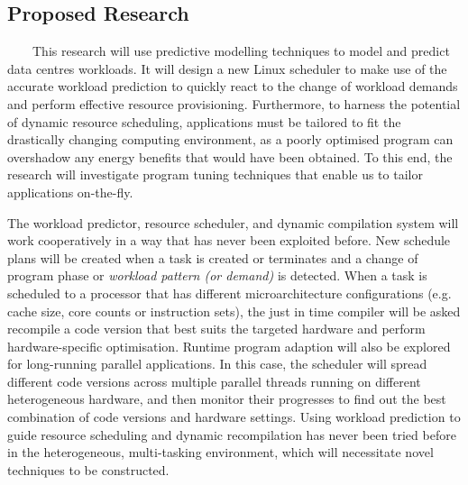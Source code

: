 \subsection{Proposed Research}
~~~~This research will use predictive modelling techniques to model and predict data centres workloads. It
will design a new Linux scheduler to make use of the accurate workload prediction to quickly react to
the change of workload demands and perform effective resource provisioning. Furthermore, to harness
the potential of dynamic resource scheduling, applications must be tailored to fit the drastically changing computing 
environment, as a poorly optimised program can overshadow any energy benefits that would
have been obtained. To this end, the research will investigate program tuning techniques that enable us to
tailor applications on-the-fly.

The workload predictor, resource scheduler, and dynamic compilation system will work cooperatively in a way that has never been exploited before. 
New schedule plans will be created when a task is created or terminates and a change of program phase or \emph{workload pattern (or demand)} is detected. 
When a task is scheduled to a processor that has different microarchitecture configurations (e.g. cache size, core counts or instruction sets), the just in time compiler 
will be asked recompile a code version that best suits the targeted hardware and perform hardware-specific optimisation. 
Runtime program adaption will also be explored for long-running parallel applications. In this case, the scheduler will spread different 
code versions across multiple parallel threads running on different heterogeneous hardware, and then monitor their progresses to find 
out the best combination of code versions and hardware settings. Using workload prediction to guide resource scheduling and 
dynamic recompilation has never been tried before in the heterogeneous, multi-tasking environment, 
which will necessitate novel techniques to be constructed. 

